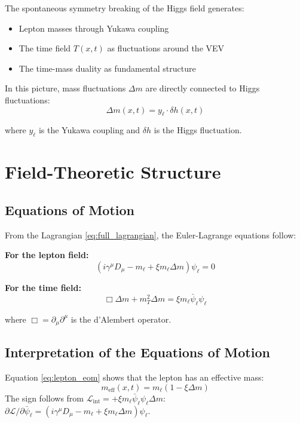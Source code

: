 	The spontaneous symmetry breaking of the Higgs field generates:
	\begin{itemize}
		\item Lepton masses through Yukawa coupling
		\item The time field $T(x,t)$ as fluctuations around the VEV
		\item The time-mass duality as fundamental structure
	\end{itemize}
	
	In this picture, mass fluctuations $\Delta m$ are directly connected to Higgs fluctuations:
	\begin{equation}
		\Delta m(x,t) = y_\ell \cdot \delta h(x,t)
		\label{eq:higgs_fluctuation}
	\end{equation}
	
	where $y_\ell$ is the Yukawa coupling and $\delta h$ is the Higgs fluctuation.
	
	\section{Field-Theoretic Structure}
	
	\subsection{Equations of Motion}
	
	From the Lagrangian \eqref{eq:full_lagrangian}, the Euler-Lagrange equations follow:
	
	\textbf{For the lepton field:}
	\begin{equation}
		(i\gamma^\mu D_\mu - m_\ell + \xi m_\ell \Delta m)\psi_\ell = 0
		\label{eq:lepton_eom}
	\end{equation}
	
	\textbf{For the time field:}
	\begin{equation}
		\Box \Delta m + m_T^2 \Delta m = \xi m_\ell \bar{\psi}_\ell \psi_\ell
		\label{eq:time_field_eom}
	\end{equation}
	
	where $\Box = \partial_\mu \partial^\mu$ is the d'Alembert operator.
	
	\subsection{Interpretation of the Equations of Motion}
	
	Equation \eqref{eq:lepton_eom} shows that the lepton has an effective mass:
	\begin{equation}
		m_{\text{eff}}(x,t) = m_\ell (1 - \xi \Delta m)
		\label{eq:effective_mass}
	\end{equation}
	The sign follows from $\mathcal{L}_{\text{int}} = +\xi m_\ell\bar\psi_\ell\psi_\ell\Delta m$: $\partial\mathcal{L}/\partial\bar\psi_\ell = (i\gamma^\mu D_\mu - m_\ell + \xi m_\ell\Delta m)\psi_\ell$.
	
